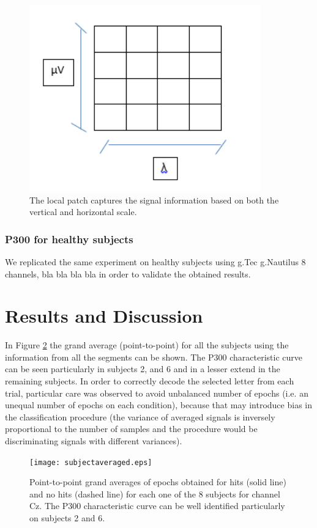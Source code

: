 \documentclass[entropy,article,submit,moreauthors,pdftex,10pt,a4paper]{mdpi}
\begin{document}
\begin{figure}[H]
\centering
\includegraphics[width=10cm]{localpatch.png}
\caption{The local patch captures the signal information based on both the vertical and horizontal scale.}
\label{fig:sampledescriptor2}
\end{figure}

\subsubsection{P300 for healthy subjects}

We replicated the same experiment on healthy subjects using g.Tec g.Nautilus 8 channels, bla bla bla bla in order to validate
the obtained results.

\section{Results and Discussion} \label{Results}
\label{section:results}
In Figure \ref{fig:subjectaveraged} the grand average (point-to-point) for all the subjects using the information from all the segments can be shown.  The P300 characteristic curve can be seen particularly in subjects 2, and 6 and in a lesser extend in the remaining subjects. In order to correctly decode the selected letter from each trial, particular care was observed to avoid unbalanced number of epochs  (i.e. an unequal number of epochs on each condition), because that may introduce bias in the classification procedure (the variance of averaged signals is inversely proportional to the number of samples and the procedure would be discriminating signals with different variances).  

\begin{figure}[H]
\centering
\texttt{[image: subjectaveraged.eps]}
\caption{Point-to-point grand averages of epochs obtained for hits (solid line) and no hits (dashed line) for each one of the 8 subjects for channel Cz. The P300 characteristic curve can be well identified particularly on subjects 2 and 6.}
\label{fig:subjectaveraged}
\end{figure}
\end{document}
